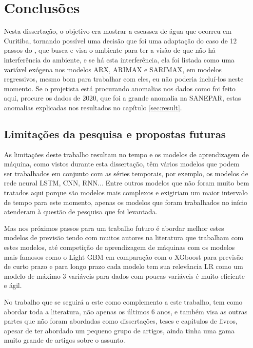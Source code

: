 \section{Conclus\~oes} \label{sec:conclusoes}

Nesta dissertação, o objetivo era mostrar a escassez de água que ocorreu em Curitiba, tornando possível uma decisão que foi uma adaptação do caso de 12 passos do , que busca e visa o ambiente para ter a visão de que não há interferência do ambiente, e se há esta interferência, ela foi listada como uma variável exógena nos modelos ARX, ARIMAX e SARIMAX, em modelos regressivos, mesmo bom para trabalhar com eles, eu não poderia incluí-los neste momento.  Se o projetista está procurando anomalias nos dados como foi feito aqui, procure os dados de 2020, que foi a grande anomalia na SANEPAR, estas anomalias explicadas nos resultados no capítulo \ref{sec:result}. 




    \subsection{Limita\c c\~oes da pesquisa e propostas futuras}

As limitações deste trabalho resultam no tempo e os modelos de aprendizagem de máquina, como vistos durante esta dissertação, têm vários modelos que podem ser trabalhados em conjunto com as séries temporais, por exemplo, os modelos de rede neural LSTM, CNN, RNN... Entre outros modelos que não foram muito bem tratados aqui porque são modelos mais complexos e exigiriam um maior intervalo de tempo para este momento, apenas os modelos que foram trabalhados no início atenderam à questão de pesquisa que foi levantada.

Mas nos próximos passos para um trabalho futuro é abordar melhor estes modelos de previsão tendo com muitos autores na literatura que trabalham com estes modelos, até competição de aprendizagem de máquinas com os modelos mais famosos como o Light GBM em comparação com o XGboost para previsão de curto prazo e para longo prazo cada modelo tem sua relevância LR como um modelo de máximo 3 variáveis para dados com poucas variáveis é muito eficiente e ágil.

No trabalho que se seguirá a este como complemento a este trabalho, tem como abordar toda a literatura, não apenas os últimos 6 anos, e também visa as outras partes que não foram abordadas como dissertações, teses e capítulos de livros, apesar de ter abordado um pequeno grupo de artigos, ainda tinha uma gama muito grande de artigos sobre o assunto. 

